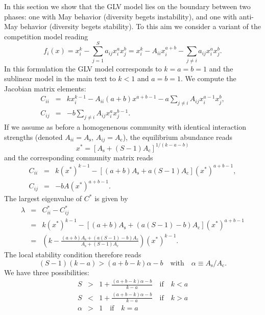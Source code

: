 \documentclass[12pt]{article}
\begin{document}
In this section we show that the GLV model lies on the boundary between two phases: one with May behavior (diversity begets instability), and one with anti-May behavior (diversity begets stability). To this aim we consider a variant of the competition model reading
\begin{equation}
    f_i(x) = x_i^k - \sum_{j = 1}^Sa_{ij}x_i^a x_j^b = x_i^k - A_{ii} x_i^{a+b}- \sum_{j \neq i}a_{ij}x_i^a x_j^b.
\end{equation}
In this formulation the GLV model corresponds to $k = a = b = 1$ and the sublinear model in the main text to $k < 1$ and $a = b = 1$. We compute the Jacobian matrix elements:
\begin{eqnarray}
    C_{ii} &=& kx_i^{k-1} - A_{ii} (a+b) x^{a+b-1} - a\sum_{j \neq i}A_{ij}x_i^{a-1} x_j^b, \\  
    C_{ij} &=& -b\sum_{j \neq i}A_{ij}x_i^{a} x_j^{b-1}.
\end{eqnarray}
If we assume as before a homogenenous community with identical interaction strengths (denoted $A_{ii} = A_{\textrm{s}}$, $A_{ij} = A_{\textrm{c}}$), the equilibrium abundance reads
\begin{equation}
    x^* = [A_{\textrm{s}} + (S-1)A_{\textrm{c}}]^{1/(k-a-b)} 
\end{equation}
and the corresponding community matrix reads
\begin{eqnarray}
    C_{ii} &=& k(x^*)^{k-1} - [(a+b) A_{\textrm{s}} + a(S-1)A_{\textrm{c}}](x^*)^{a+b-1}, \\  
    C_{ij} &=& -bA(x^*)^{a+b-1}.
\end{eqnarray}
The largest eigenvalue of $C^*$ is given by
\begin{eqnarray}
    \lambda &=& C^*_{ii} - C^*_{ij}\\
     &=& k(x^*)^{k-1} - [(a+b)A_{\textrm{s}} +(a(S-1)-b)A_{\textrm{c}}](x^*)^{a+b-1}\\
    & = & \left(k - \frac{(a+b)A_{\textrm{s}} +(a(S-1)-b)A_{\textrm{c}}}{A_{\textrm{s}} + (S-1)A_{\textrm{c}}}\right)(x^*)^{k-1}.
\end{eqnarray}
The local stability condition therefore reads
\begin{equation}
    (S-1)(k-a) > (a+b - k)\alpha - b \quad \textrm{with}\quad \alpha \equiv A_{\textrm{s}}/A_{\textrm{c}}. 
\end{equation}
We have three possibilities:
\begin{eqnarray}
    S &>& 1 + \frac{(a+b - k)\alpha - b}{k-a} \quad \textrm{if}\quad k < a\\
    S &<& 1 + \frac{(a+b - k)\alpha - b}{k-a} \quad \textrm{if}\quad k > a\\
    \alpha &>& 1 \quad \textrm{if}\quad k = a 
\end{eqnarray}
\end{document}
